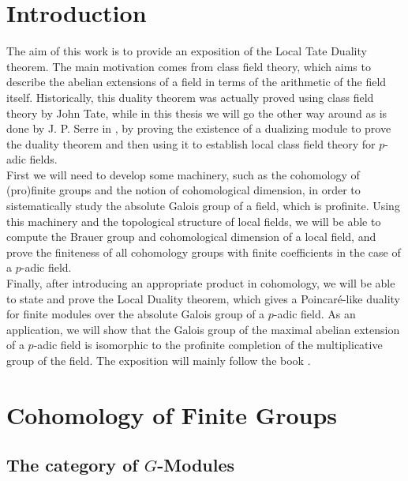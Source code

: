 \documentclass[a4paper, oneside]{memoir}
\begin{document}
\tableofcontents

\chapter*{Introduction}
The aim of this work is to provide an exposition of the Local Tate Duality theorem. The main motivation comes from class field theory, which aims to describe the abelian
extensions of a field in terms of the arithmetic of the field itself. Historically, this duality theorem was actually proved using class field theory by John Tate, while in this thesis we will go the other way around as is done by J. P. Serre in \cite{SerreCG}, by proving the existence of a dualizing module to prove the duality theorem and then using it to establish local class field theory for $p$-adic fields.\\

First we will need to develop some machinery, such as the cohomology of (pro)finite groups and the notion of cohomological dimension, in order to sistematically study the absolute Galois group of
a field, which is profinite. Using this machinery and the topological structure of local fields, we will be able to compute the Brauer group and cohomological dimension of a local field, and prove the
finiteness of all cohomology groups with finite coefficients in the case of a $p$-adic field.\\

Finally, after introducing an appropriate product in cohomology, we will be able to state and prove the Local Duality theorem, which gives a Poincaré-like duality for finite modules over the
absolute Galois group of a $p$-adic field. As an application, we will show that the Galois group of the maximal abelian extension of a $p$-adic field is isomorphic to the profinite
completion of the multiplicative group of the field. The exposition will mainly follow the book \cite{Harari}.


\chapter{Cohomology of Finite Groups}

\section{\texorpdfstring{The category of $G$-Modules}{The category of G-Modules}}
\end{document}
